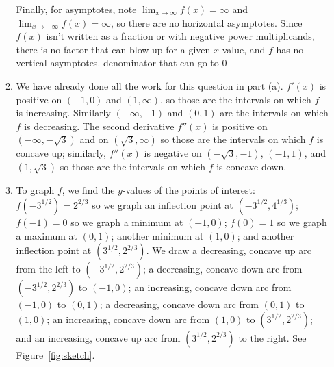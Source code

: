 \documentclass{article}
\newcommand{\ds}{\displaystyle}
\begin{document}
\begin{enumerate}
\begin{enumerate}
    Finally, for asymptotes, note $\ds\lim_{x\to\infty} f(x) = \infty$ and
    $\ds\lim_{x\to -\infty} f(x) = \infty$, so there are no horizontal
    asymptotes.  Since $f(x)$ isn't written as a fraction or with negative
    power multiplicands, there is no factor that can blow up for a given
    $x$ value, and $f$ has no vertical asymptotes.
    denominator that can go to $0$ 
  \item We have already done all the work for this question in part (a).
    $f'(x)$ is positive on $(-1,0)$ and $(1,\infty)$, so those are the
    intervals on which $f$ is increasing.  Similarly $(-\infty,-1)$ and
    $(0,1)$ are the intervals on which $f$ is decreasing.  The
    second derivative $f''(x)$ is positive on $(-\infty,-\sqrt{3})$
    and on $(\sqrt{3},\infty)$ so those are the intervals on which $f$
    is concave up; similarly, $f''(x)$ is negative on $(-\sqrt{3},-1)$,
    $(-1,1)$, and $(1,\sqrt{3})$ so those are the intervals on which $f$
    is concave down.
  \item To graph $f$, we find the $y$-values of the points of interest:
    $f(-3^{1/2})=2^{2/3}$ so we graph an inflection point at 
    $(-3^{1/2},4^{1/3})$; $f(-1)=0$ so we graph a minimum at $(-1,0)$;
    $f(0)=1$ so we graph a maximum at $(0,1)$; another minimum at $(1,0)$;
    and another inflection point at $(3^{1/2},2^{2/3})$.  We draw a 
    decreasing, concave up arc from the left to $(-3^{1/2},2^{2/3})$; a
    decreasing, concave down arc from $(-3^{1/2},2^{2/3})$ to $(-1,0)$;
    an increasing, concave down arc from $(-1,0)$ to $(0,1)$; a decreasing,
    concave down arc from $(0,1)$ to $(1,0)$; an increasing, concave down
    arc from $(1,0)$ to $(3^{1/2},2^{2/3})$; and an increasing, concave up
    arc from $(3^{1/2},2^{2/3})$ to the right.  See Figure~\ref{fig:sketch}.
    \begin{figure}
      \begin{center}

\end{center}
\end{figure}
\end{enumerate}
\end{enumerate}
\end{document}
